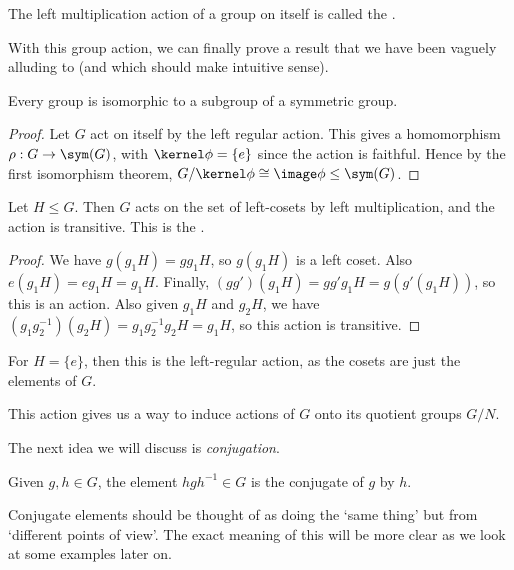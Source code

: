 \begin{definition}
	The left multiplication action of a group on itself is called the .
\end{definition}

With this group action, we can finally prove a result that we have been vaguely alluding to (and which should make intuitive sense).

\begin{theorem}
	Every group is isomorphic to a subgroup of a symmetric group. 
\end{theorem}
\begin{proof}
	Let $G$ act on itself by the left regular action. This gives a homomorphism $\rho: G \rightarrow \sym(G)$,
	with $\kernel \phi = \{e\}$ since the action is faithful. Hence by the first isomorphism theorem, $G/\kernel \phi \cong \image\phi \leq \sym(G)$.
\end{proof}

\begin{proposition}
	Let $H \leq G$. Then $G$ acts on the set of left-cosets by left multiplication, and the action is transitive. This is the .
\end{proposition}
\begin{proof}
	We have $g(g_1H) = gg_1 H$, so $g(g_1H)$ is a left coset. Also $e(g_1H) = e g_1 H = g_1 H$. Finally, $(gg')(g_1 H) = g g' g_1 H = g(g'(g_1 H))$, so this is an action. Also given $g_1 H$ and $g_2 H$, we have $(g_1 g_2^{-1})(g_2 H) = g_1 g_2^{-1} g_2 H = g_1 H$, so this action is transitive.
\end{proof}
\begin{remark}
	For $H = \{e\}$, then this is the left-regular action, as the cosets are just the elements of $G$.
\end{remark}
This action gives us a way to induce actions of $G$ onto its quotient groups $G/N$.


The next idea we will discuss is \emph{conjugation}.

\begin{definition}[Conugation]
	Given $g, h \in G$, the element $h g h^{-1} \in G$ is the conjugate of $g$ by $h$.
\end{definition}

Conjugate elements should be thought of as doing the `same thing' but from `different points of view'. The exact meaning of this will be more clear as we look at some examples later on.

